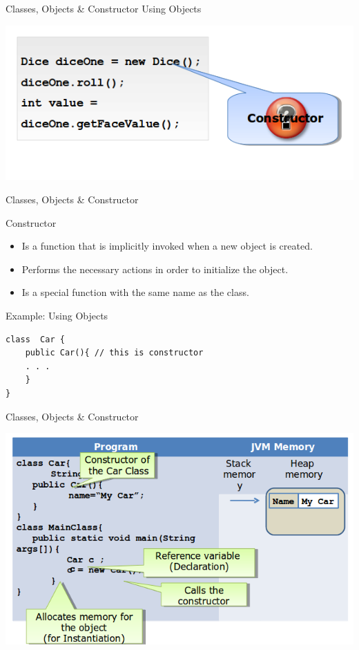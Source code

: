 \documentclass[14pt]{beamer}
\begin{document}
\begin{frame}[fragile]{Classes, Objects \& Constructor}
Using Objects

\begin{center}
      \includegraphics[scale=0.5]{COJ-M01-S03-Image16.png}
\end{center}
\end{frame}

 \begin{frame}[fragile]{Classes, Objects \& Constructor}
    \begin{block}{}
        Constructor
    \end{block}
    \begin{itemize}
        \item Is a function that is implicitly invoked when a new object is created.
        \item Performs the necessary actions in order to initialize the object.
        \item Is a special function with the same name as the class.
    \end{itemize}
    Example:
    Using Objects

    \begin{lstlisting}[numbers=none]
class  Car {
    public Car(){ // this is constructor
    . . . 
    }
}
\end{lstlisting}
\end{frame}

\begin{frame}[fragile]{Classes, Objects \& Constructor}


\begin{center}
          \includegraphics[scale=0.5]{COJ-M01-S03-Image17.png}
                  \end{center}
\end{frame}
\end{document}
